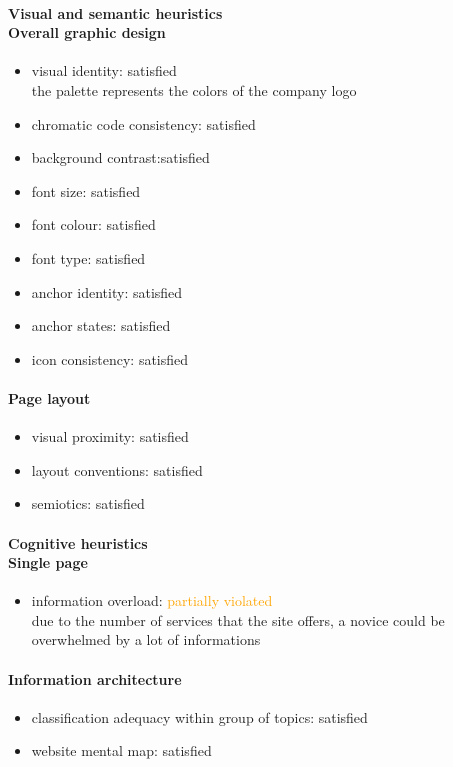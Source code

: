 \begin{enumerate}
	\paragraph*{Visual and semantic heuristics \\ Overall graphic design }
	\begin{itemize}
		\item visual identity: satisfied\\
		the palette represents the colors of the company logo
		\item chromatic code consistency: satisfied
		\item background contrast:satisfied
		\item font size: satisfied
		\item font colour: satisfied
		\item font type: satisfied
		\item anchor identity: satisfied
		\item anchor states: satisfied
		\item icon consistency: satisfied
	\end{itemize}
	
	\paragraph*{Page layout}
	\begin{itemize}
		\item visual proximity: satisfied
		\item layout conventions: satisfied
		\item semiotics: satisfied
	\end{itemize}	
	
	\paragraph*{Cognitive heuristics \\ Single page}
	\begin{itemize}
		\item information overload: \textcolor{orange}{partially violated}\\
		due to the number of services that the site offers, a novice could be overwhelmed by a lot of informations
	\end{itemize}	
	
	\paragraph*{Information architecture}
	\begin{itemize}
		\item classification adequacy within group of topics: satisfied
		\item website mental map: satisfied
	\end{itemize}


\end{enumerate}
